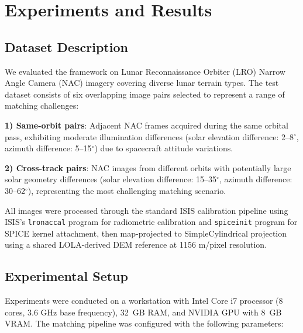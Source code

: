 \documentclass[lettersize,journal]{IEEEtran}
\begin{document}

\section{Experiments and Results}\label{sec:experiments}

\subsection{Dataset Description}

We evaluated the framework on Lunar Reconnaissance Orbiter (LRO) Narrow Angle Camera (NAC) imagery covering diverse lunar terrain types. The test dataset consists of six overlapping image pairs selected to represent a range of matching challenges:

\textbf{1) Same-orbit pairs}: Adjacent NAC frames acquired during the same orbital pass, exhibiting moderate illumination differences (solar elevation difference: 2--8$^\circ$, azimuth difference: 5--15$^\circ$) due to spacecraft attitude variations.

\textbf{2) Cross-track pairs}: NAC images from different orbits with potentially large solar geometry differences (solar elevation difference: 15--35$^\circ$, azimuth difference: 30--62$^\circ$), representing the most challenging matching scenario.

All images were processed through the standard ISIS calibration pipeline using ISIS's \texttt{lronaccal} program for radiometric calibration and \texttt{spiceinit} program for SPICE kernel attachment, then map-projected to SimpleCylindrical projection using a shared LOLA-derived DEM reference at 1156 m/pixel resolution.

\subsection{Experimental Setup}

Experiments were conducted on a workstation with Intel Core i7 processor (8 cores, 3.6 GHz base frequency), 32~GB RAM, and NVIDIA GPU with 8~GB VRAM. The matching pipeline was configured with the following parameters:
\end{document}
